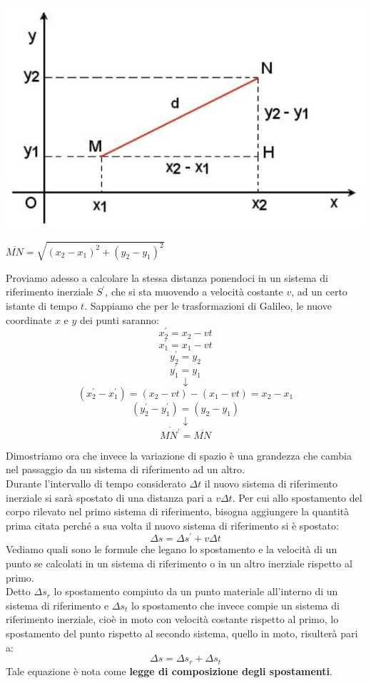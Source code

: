 \documentclass[a4paper,12pt, oneside]{book}
\begin{document}
\begin{center}
\includegraphics[scale=0.5]{img/gal.png}
\end{center}
$\overline{MN}=\sqrt{(x_2-x_1)^2+(y_2-y_1)^2}$

Proviamo adesso a calcolare la stessa distanza ponendoci in un sistema di riferimento inerziale $S^{'}$, che si sta muovendo a velocità costante $v$, ad un certo istante di tempo $t$. Sappiamo che per le trasformazioni di Galileo, le nuove coordinate $x$ e $y$ dei punti saranno:
$$x^{'}_2=x_2-vt$$
$$x^{'}_1=x_1-vt$$
$$y^{'}_2=y_2$$
$$y^{'}_1=y_1$$
$$\downarrow$$
$$(x^{'}_2-x^{'}_1)=(x_2-vt)-(x_1-vt)=x_2-x_1$$
$$(y^{'}_2-y^{'}_1)=(y_2-y_1)$$
$$\downarrow$$
$$\overline{MN^{'}}=\overline{MN}$$

Dimostriamo ora che invece la variazione di spazio è una grandezza che cambia nel passaggio da un sistema di riferimento ad un altro.
\\ Durante l’intervallo di tempo considerato $\Delta t$ il nuovo sistema di riferimento inerziale si sarà spostato di una distanza pari a $v\Delta t$. Per cui allo spostamento del corpo rilevato nel primo sistema di riferimento, bisogna aggiungere la quantità prima citata perché a sua volta il nuovo sistema di riferimento si è spostato:
$$\Delta s=\Delta s^{'}+v\Delta t$$
Vediamo quali sono le formule che legano lo spostamento e la velocità di un punto se calcolati in un sistema di riferimento o in un altro inerziale rispetto al primo.\\
Detto $\Delta s_r$ lo spostamento compiuto da un punto materiale all'interno di un sistema di riferimento e $\Delta  s_t$ lo spostamento che invece compie un sistema di riferimento inerziale, cioè in moto con velocità costante rispetto al primo, lo spostamento del punto rispetto al secondo sistema, quello in moto, risulterà pari a:
$$\Delta s=\Delta s_r+\Delta s_t$$
Tale equazione è nota come \textbf{legge di composizione degli spostamenti}.\\
\end{document}
